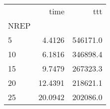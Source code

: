\begin{tabular}{lrr}
\toprule
{} &     time &       ttt \\
NREP &          &           \\
\midrule
5    &   4.4126 &  546171.0 \\
10   &   6.1816 &  346898.4 \\
15   &   9.7479 &  267323.3 \\
20   &  12.4391 &  218621.1 \\
25   &  20.0942 &  202086.0 \\
\bottomrule
\end{tabular}

